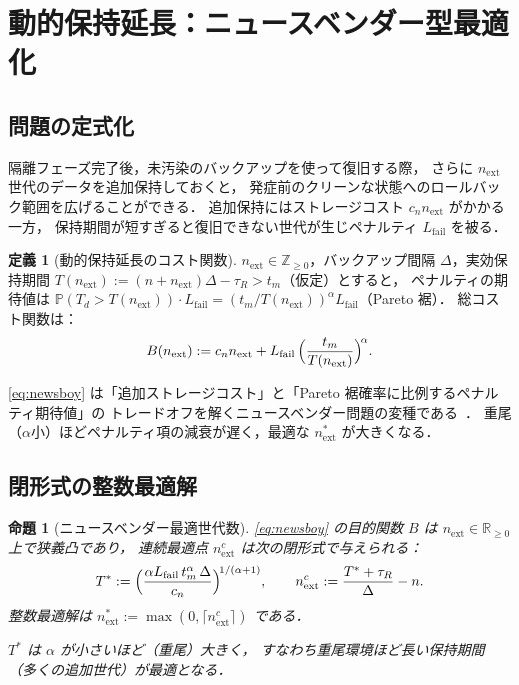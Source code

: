 \documentclass[12pt,a4paper]{article}
\theoremstyle{plain}
\newtheorem{proposition}[theorem]{命題}
\theoremstyle{definition}
\newtheorem{definition}[theorem]{定義}
\theoremstyle{remark}
\newcommand{\Prob}{\mathbb{P}}
\newcommand{\Z}{\mathbb{Z}}
\begin{document}
\section{動的保持延長：ニュースベンダー型最適化}
\label{sec:newsboy}

\subsection{問題の定式化}

隔離フェーズ完了後，未汚染のバックアップを使って復旧する際，
さらに $n_{\mathrm{ext}}$ 世代のデータを追加保持しておくと，
発症前のクリーンな状態へのロールバック範囲を広げることができる．
追加保持にはストレージコスト $c_n n_{\mathrm{ext}}$ がかかる一方，
保持期間が短すぎると復旧できない世代が生じペナルティ $L_{\mathrm{fail}}$ を被る．

\begin{definition}[動的保持延長のコスト関数]\label{def:newsboy}
$n_{\mathrm{ext}}\in\Z_{\ge0}$，バックアップ間隔 $\Delta$，実効保持期間
$T(n_{\mathrm{ext}}):=(n+n_{\mathrm{ext}})\Delta-\tau_R>t_m$（仮定）とすると，
ペナルティの期待値は $\Prob(T_d>T(n_{\mathrm{ext}}))\cdot L_{\mathrm{fail}}=(t_m/T(n_{\mathrm{ext}}))^\alpha L_{\mathrm{fail}}$（Pareto 裾）．
総コスト関数は：
\begin{equation}\label{eq:newsboy}
B(n_{\mathrm{ext}}):=c_n n_{\mathrm{ext}}+L_{\mathrm{fail}}\,\Bigl(\frac{t_m}{T(n_{\mathrm{ext}})}\Bigr)^{\!\alpha}.
\end{equation}
\end{definition}

\eqref{eq:newsboy} は「追加ストレージコスト」と「Pareto 裾確率に比例するペナルティ期待値」の
トレードオフを解くニュースベンダー問題の変種である~\cite{porteus2002}．
重尾（$\alpha$小）ほどペナルティ項の減衰が遅く，最適な $n_{\mathrm{ext}}^*$ が大きくなる．

\subsection{閉形式の整数最適解}

\begin{proposition}[ニュースベンダー最適世代数]\label{prop:newsboy}
\eqref{eq:newsboy} の目的関数 $B$ は $n_{\mathrm{ext}}\in\mathbb{R}_{\ge0}$ 上で狭義凸であり，
連続最適点 $n_{\mathrm{ext}}^c$ は次の閉形式で与えられる：
\begin{equation}\label{eq:T_star}
T^*:=\Bigl(\frac{\alpha L_{\mathrm{fail}}\,t_m^\alpha\,\Delta}{c_n}\Bigr)^{\!1/(\alpha+1)},
\qquad
n_{\mathrm{ext}}^c:=\frac{T^*+\tau_R}{\Delta}-n.
\end{equation}
整数最適解は $n_{\mathrm{ext}}^*:=\max(0,\lceil n_{\mathrm{ext}}^c\rceil)$ である．

$T^*$ は $\alpha$ が小さいほど（重尾）大きく，
すなわち重尾環境ほど長い保持期間（多くの追加世代）が最適となる．
\end{proposition}
\end{document}
